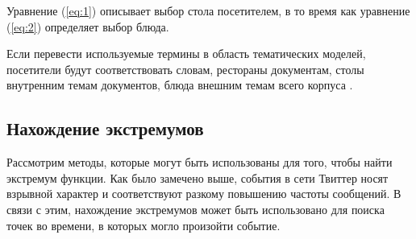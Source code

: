 \documentclass[12pt, a4paper]{article}
\begin{document}
  Уравнение (\ref{eq:1}) описывает выбор стола посетителем, в то время как уравнение (\ref{eq:2}) определяет выбор блюда.
  
  Если перевести используемые термины в область тематических моделей, посетители будут соответствовать словам, рестораны документам, столы внутренним темам документов, блюда внешним темам всего корпуса \cite{hdp-1}.
  
	\subsection{Нахождение экстремумов}
	\label{maxima-detection-subsection}
	Рассмотрим методы, которые могут быть использованы для того, чтобы найти экстремум функции. Как было замечено выше, события в сети Твиттер носят взрывной характер и соответствуют разкому повышению частоты сообщений. В связи с этим, нахождение экстремумов может быть использовано для поиска точек во времени, в которых могло произойти событие.
	
\end{document}
